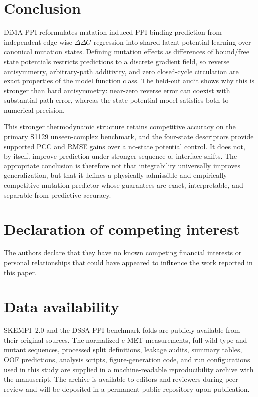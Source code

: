 \documentclass[preprint,12pt]{elsarticle}
\newcommand{\ddg}{\Delta\Delta G}
\begin{document}
\section{Conclusion}
\label{sec:conclusion}

DiMA-PPI reformulates mutation-induced PPI binding prediction from independent edge-wise $\ddg$ regression into shared latent potential learning over canonical mutation states. Defining mutation effects as differences of bound/free state potentials restricts predictions to a discrete gradient field, so reverse antisymmetry, arbitrary-path additivity, and zero closed-cycle circulation are exact properties of the model function class. The held-out audit shows why this is stronger than hard antisymmetry: near-zero reverse error can coexist with substantial path error, whereas the state-potential model satisfies both to numerical precision.

This stronger thermodynamic structure retains competitive accuracy on the primary S1129 unseen-complex benchmark, and the four-state descriptors provide supported PCC and RMSE gains over a no-state potential control. It does not, by itself, improve prediction under stronger sequence or interface shifts. The appropriate conclusion is therefore not that integrability universally improves generalization, but that it defines a physically admissible and empirically competitive mutation predictor whose guarantees are exact, interpretable, and separable from predictive accuracy.

\section*{Declaration of competing interest}
The authors declare that they have no known competing financial interests or personal relationships that could have appeared to influence the work reported in this paper.

\section*{Data availability}
SKEMPI~2.0 and the DSSA-PPI benchmark folds are publicly available from their original sources. The normalized c-MET measurements, full wild-type and mutant sequences, processed split definitions, leakage audits, summary tables, OOF predictions, analysis scripts, figure-generation code, and run configurations used in this study are supplied in a machine-readable reproducibility archive with the manuscript. The archive is available to editors and reviewers during peer review and will be deposited in a permanent public repository upon publication.
\end{document}
